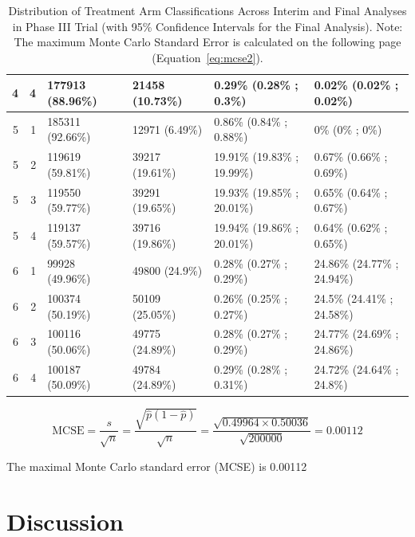 \documentclass[11pt, a4paper]{article}\usepackage[]{graphicx}\usepackage[]{xcolor}
\begin{document}
\begin{landscape}
\begin{table}[ht]
\begin{tabular}{rrllll}
    4 &   4 & 177913 (88.96\%) & 21458 (10.73\%) & 0.29\% (0.28\% ; 0.3\%) & 0.02\% (0.02\% ; 0.02\%) \\ 
   \hline 
  5 &   1 & 185311 (92.66\%) & 12971 (6.49\%) & 0.86\% (0.84\% ; 0.88\%) & 0\% (0\% ; 0\%) \\ 
    5 &   2 & 119619 (59.81\%) & 39217 (19.61\%) & 19.91\% (19.83\% ; 19.99\%) & 0.67\% (0.66\% ; 0.69\%) \\ 
    5 &   3 & 119550 (59.77\%) & 39291 (19.65\%) & 19.93\% (19.85\% ; 20.01\%) & 0.65\% (0.64\% ; 0.67\%) \\ 
    5 &   4 & 119137 (59.57\%) & 39716 (19.86\%) & 19.94\% (19.86\% ; 20.01\%) & 0.64\% (0.62\% ; 0.65\%) \\ 
   \hline 
  6 &   1 & 99928 (49.96\%) & 49800 (24.9\%) & 0.28\% (0.27\% ; 0.29\%) & 24.86\% (24.77\% ; 24.94\%) \\ 
    6 &   2 & 100374 (50.19\%) & 50109 (25.05\%) & 0.26\% (0.25\% ; 0.27\%) & 24.5\% (24.41\% ; 24.58\%) \\ 
    6 &   3 & 100116 (50.06\%) & 49775 (24.89\%) & 0.28\% (0.27\% ; 0.29\%) & 24.77\% (24.69\% ; 24.86\%) \\ 
    6 &   4 & 100187 (50.09\%) & 49784 (24.89\%) & 0.29\% (0.28\% ; 0.31\%) & 24.72\% (24.64\% ; 24.8\%) \\ 
   \hline 
 \hline
\end{tabular}
\caption{Distribution of Treatment Arm Classifications Across Interim and Final Analyses in Phase III Trial (with 95\% Confidence Intervals for the Final Analysis). Note: The maximum Monte Carlo Standard Error is calculated on the following page (Equation~\ref{eq:mcse2}).} 
\label{tab:outcome_distribution_phase3}
\end{table}

\end{landscape}

\begin{equation}
\text{MCSE} = \frac{s}{\sqrt{n}} = \frac{\sqrt{\hat{p}(1 - \hat{p})}}{\sqrt{n}} = \frac{\sqrt{0.49964 \times 0.50036}}{\sqrt{200000}} = 0.00112 \label{eq:mcse2}
\end{equation}

The maximal Monte Carlo standard error (MCSE) is 0.00112



\newpage
\section{Discussion} \label{sec:discussion}
\end{document}
